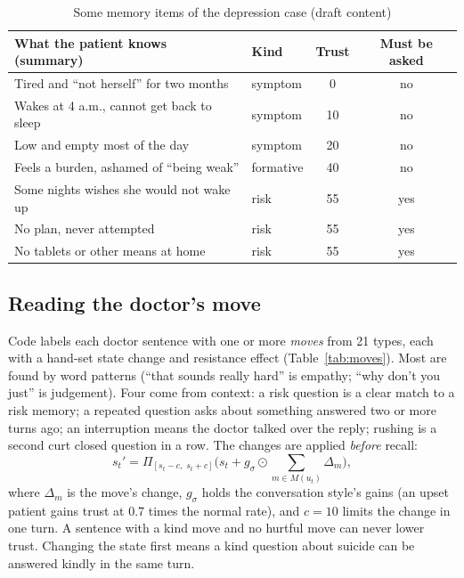 \documentclass[sn-basic,Numbered]{sn-jnl}
\begin{document}
\begin{table}[t]
\caption{Some memory items of the depression case (draft content)}
\label{tab:memory}
\footnotesize
\begin{tabularx}{\linewidth}{@{}Ylcc@{}}
\toprule
What the patient knows (summary) & Kind & Trust & Must be asked\\
\midrule
Tired and ``not herself'' for two months & symptom & 0 & no\\
Wakes at 4 a.m., cannot get back to sleep & symptom & 10 & no\\
Low and empty most of the day & symptom & 20 & no\\
Feels a burden, ashamed of ``being weak'' & formative & 40 & no\\
Some nights wishes she would not wake up & risk & 55 & yes\\
No plan, never attempted & risk & 55 & yes\\
No tablets or other means at home & risk & 55 & yes\\
\bottomrule
\end{tabularx}
\end{table}

\subsection{Reading the doctor's move}
Code labels each doctor sentence with one or more \emph{moves} from 21 types, each with a hand-set state change and resistance effect
(Table~\ref{tab:moves}). Most are found by word patterns (``that sounds really hard'' is empathy; ``why don't you just'' is judgement). Four
come from context: a risk question is a clear match to a risk memory; a repeated question asks about something answered two or more turns
ago; an interruption means the doctor talked over the reply; rushing is a second curt closed question in a row. The changes are applied
\emph{before} recall:
\begin{equation}
s_t' = \Pi_{[s_t-c,\;s_t+c]}\Big(s_t + g_\sigma\odot \sum_{m\in M(u_t)}\Delta_m\Big),
\end{equation}
where $\Delta_m$ is the move's change, $g_\sigma$ holds the conversation style's gains (an upset patient gains trust at 0.7 times the normal
rate), and $c=10$ limits the change in one turn. A sentence with a kind move and no hurtful move can never lower trust. Changing the state
first means a kind question about suicide can be answered kindly in the same turn.
\end{document}
